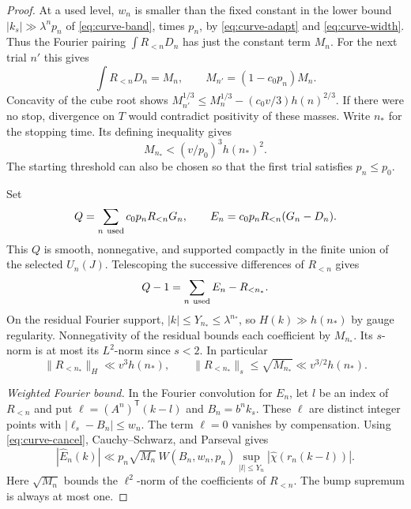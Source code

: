 \documentclass[11pt,a4paper,reqno]{amsart}
\theoremstyle{definition}
\theoremstyle{remark}
\numberwithin{equation}{section}
\begin{document}
\begin{proof}
At a used level, \(w_n\) is smaller than the fixed constant in the
lower bound \(|k_s|\gg\lambda^n p_n\) of \eqref{eq:curve-band}, times
\(p_n\), by \eqref{eq:curve-adapt} and \eqref{eq:curve-width}.
Thus the Fourier pairing \(\int R_{<n}D_n\) has just the constant
term \(M_n\). For the next trial \(n'\) this gives
\[
          \int R_{<n}D_n=M_n,\qquad M_{n'}=(1-c_0p_n)M_n .
\]
Concavity of the cube root shows
\(M_{n'}^{1/3}\le M_n^{1/3}-(c_0v/3)h(n)^{2/3}\).
If there were no stop, divergence on \(T\) would contradict positivity
of these masses. Write \(n_*\) for the stopping time. Its defining
inequality gives
\begin{equation}\label{eq:curve-residual-mass}
                   M_{n_*}<(v/p_0)^3 h(n_*)^2.
\end{equation}
The starting threshold can also be chosen so that the first trial
satisfies \(p_n\le p_0\).

Set
\[
   Q=\sum_{n\ {\rm used}} c_0p_n R_{<n}G_n,\qquad
   E_n=c_0p_n R_{<n}(G_n-D_n).
\]
This \(Q\) is smooth, nonnegative, and supported compactly in the
finite union of the selected \(U_n(J)\). Telescoping the successive
differences of \(R_{<n}\) gives
\begin{equation}\label{eq:curve-telescope}
                       Q-1=\sum_{n\ {\rm used}} E_n-R_{<n_*}.
\end{equation}
On the residual Fourier support, \(|k|\le Y_{n_*}\le\lambda^{n_*}\),
so \(H(k)\gg h(n_*)\) by gauge regularity. Nonnegativity of the
residual bounds each coefficient by \(M_{n_*}\). Its \(s\)-norm
is at most its \(L^2\)-norm since \(s<2\). In particular
\begin{equation}\label{eq:curve-residual}
 \|R_{<n_*}\|_H\ll v^3 h(n_*),\qquad
 \|R_{<n_*}\|_s\le\sqrt{M_{n_*}}\ll v^{3/2}h(n_*).
\end{equation}

\medskip
\noindent\emph{Weighted Fourier bound.}
In the Fourier convolution for \(E_n\), let \(l\) be an index of
\(R_{<n}\) and put \(\ell=(A^n)^{\mathsf T}(k-l)\) and
\(B_n=b^n k_s\). These \(\ell\) are distinct integer points with
\(|\ell_s-B_n|\le w_n\). The term \(\ell=0\) vanishes by compensation.
Using \eqref{eq:curve-cancel}, Cauchy--Schwarz, and Parseval gives
\begin{equation}\label{eq:curve-error-coeff}
 |\widehat E_n(k)|\ll p_n\sqrt{M_n}\,W(B_n,w_n,p_n)
       \sup_{|l|\le Y_n}|\widehat\chi(r_n(k-l))|.
\end{equation}
Here \(\sqrt{M_n}\) bounds the \(\ell^2\)-norm of the coefficients of
\(R_{<n}\). The bump supremum is always at most one.


\end{proof}
\end{document}
